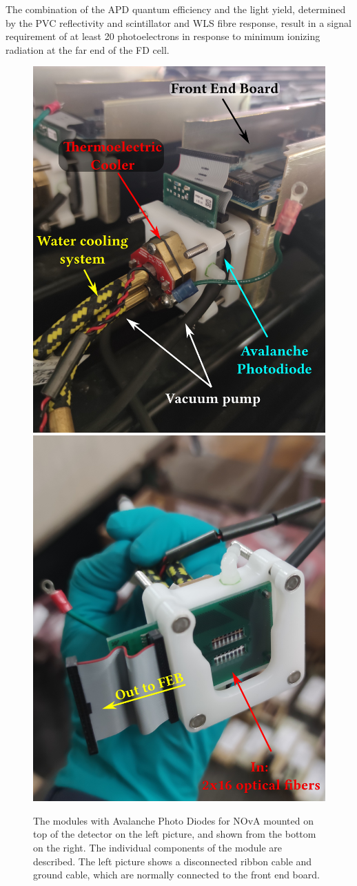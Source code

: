 The combination of the APD quantum efficiency and the light yield, determined by the PVC reflectivity and scintillator and WLS fibre response, result in a signal requirement of at least 20 photoelectrons in response to minimum ionizing radiation at the far end of the FD cell.



\begin{figure}[!htb]  
  \centering
  \includegraphics*[width=.495\textwidth]{Plots/NOvAExperiment/NOvAAPDMountedWithLabels.jpg}
  \noindent\centering
  \includegraphics*[width=.495\textwidth]{Plots/NOvAExperiment/NOvAAPDBottomWithLabels.jpg}
  \caption[NOvA Avalanche Photo Diods]{The modules with Avalanche Photo Diodes for NOvA mounted on top of the detector on the left picture, and shown from the bottom on the right. The individual components of the module are described. The left picture shows a disconnected ribbon cable and ground cable, which are normally connected to the front end board.}
 \label{fig:NOvAAPD}
\end{figure}

